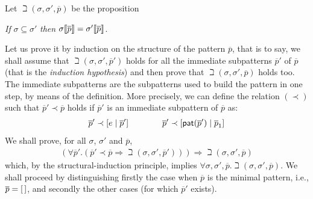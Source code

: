 Let \(\beth(\sigma, \sigma', \overline{p})\) be the proposition
\begin{center}
\emph{If} \(\sigma \subseteq \sigma'\)
\emph{then} \(\subst{\overline{p}}{\sigma} =
  \subst{\overline{p}}{\sigma'}\).
\end{center}
Let us prove it by induction on the structure of the pattern
\(\overline{p}\), that is to say, we shall assume that \(\beth(\sigma,
\sigma', \overline{p}')\) holds for all the immediate subpatterns
\(\overline{p}'\) of \(\overline{p}\) (that is the \emph{induction
  hypothesis}) and then prove that \(\beth(\sigma, \sigma',
\overline{p})\) holds too. The immediate subpatterns are the
subpatterns used to build the pattern in one step, by means of the
definition. More precisely, we can define the relation \((\prec)\)
such that \(\overline{p}' \prec \overline{p}\) holds if
\(\overline{p}'\) is an immediate subpattern of \(\overline{p}\) as:
\begin{gather*}
\overline{p}' \prec \cons{e}{\overline{p}'} \qquad\qquad
\overline{p}' \prec \cons{\pat{\overline{p}'}}{\overline{p}_1}
\end{gather*}
We shall prove, for all \(\sigma\), \(\sigma'\) and \(\overline{p}\),
\begin{gather*}
(\forall \overline{p}'.(\overline{p}' \prec \overline{p} \Rightarrow
  \beth(\sigma, \sigma', \overline{p}'))) \Rightarrow \beth(\sigma,
  \sigma', \overline{p})
\end{gather*}
which, by the structural\hyp{}induction principle, implies \(\forall
\sigma, \sigma', \overline{p}.\beth(\sigma, \sigma',
\overline{p})\). We shall proceed by distinguishing firstly the case
when \(\overline{p}\) is the minimal pattern, i.e., \(\overline{p} =
\el\), and secondly the other cases (for which \(\overline{p}'\)
exists).
